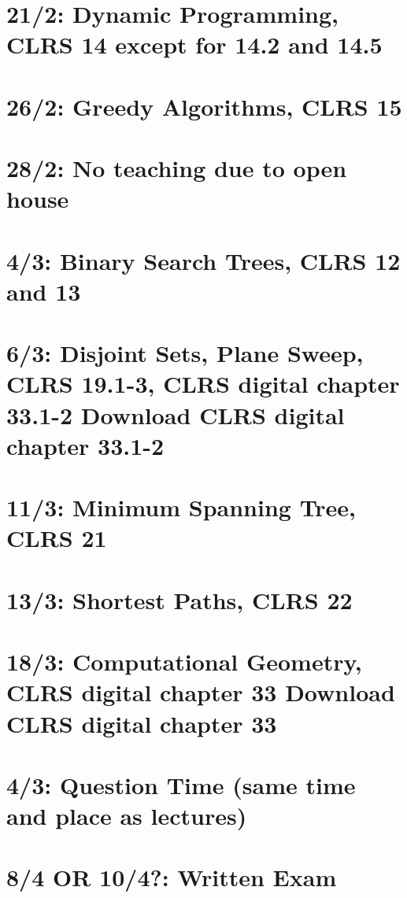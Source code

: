 \section{21/2: Dynamic Programming, CLRS 14 except for 14.2 and 14.5}
\section{26/2: Greedy Algorithms, CLRS 15}
\section{28/2: No teaching due to open house}
\section{4/3: Binary Search Trees, CLRS 12 and 13}
\section{6/3: Disjoint Sets, Plane Sweep, CLRS 19.1-3, CLRS digital chapter 33.1-2
  Download CLRS digital chapter 33.1-2}
\section{11/3: Minimum Spanning Tree, CLRS 21}
\section{13/3: Shortest Paths, CLRS 22}
\section{18/3: Computational Geometry, CLRS digital chapter 33
  Download CLRS digital chapter 33}
\section{4/3: Question Time (same time and place as lectures)}
\section{8/4 OR 10/4?: Written Exam}
